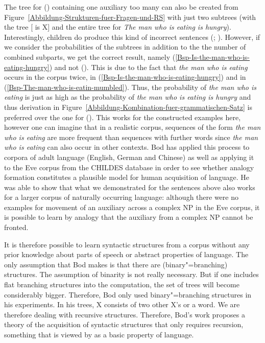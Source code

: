 The tree for () containing one auxiliary too many can also be created from Figure~\ref{Abbildung-Strukturen-fuer-Fragen-und-RS} with just two subtrees 
(with the tree [ is X] and the entire tree for \emph{The man who is eating is hungry}).
\z
Interestingly, children do produce this kind of incorrect sentences (\citealp[]{CN87a-u}; \citealp*{ARP2008a}). 
However, if we consider the probabilities of the subtrees in addition to the the number of combined
subparts, we get the correct result, namely (\ref{Bsp-Is-the-man-who-is-eating-hungry}) and not ().
This is due to the fact that \emph{the man who is eating} occurs in the corpus twice, in (\ref{Bsp-Is-the-man-who-is-eating-hungry}) and in
(\ref{Bsp-The-man-who-is-eatin-mumbled}).
\largerpage{}
Thus, the probability of \emph{the man who
  is eating} is just as high as the probability of \emph{the man who is eating is hungry} and thus derivation in Figure~\ref{Abbildung-Kombination-fuer-grammatischen-Satz} 
  is preferred over the one for ().
This works for the constructed examples here, however one can imagine that in a realistic corpus, sequences of the form \emph{the man who is eating} are more frequent
than sequences with further words since \emph{the man who is eating} can also occur in other contexts.
Bod has applied this process to corpora of adult language (English, German and Chinese) as well as
applying it to the Eve corpus from the CHILDES database in order to see whether analogy formation constitutes a plausible model
for human acquisition of language. He was able to show that what we demonstrated for
the sentences above also works for a larger corpus of
naturally occurring language: although there were no examples for movement of an auxiliary across a complex NP in the Eve corpus, it is possible to learn
by analogy that the auxiliary from a complex NP cannot be fronted.

It is therefore possible to learn syntactic structures from a corpus without any prior knowledge
about parts of speech or abstract properties of language.
The only assumption that Bod makes is that there are (binary"=branching) structures. The assumption of binarity is not really
necessary. But if one includes flat branching structures into the computation, the set of trees will
become considerably bigger. Therefore, Bod only used binary"=branching structures in his
experiments. In his trees, X consists of two other X's or a word. We are therefore dealing with
recursive structures. Therefore, Bod's work proposes a theory of the acquisition of
syntactic structures that only requires recursion, something that is viewed by \citet*{HCF2002a} as a basic property of language.

